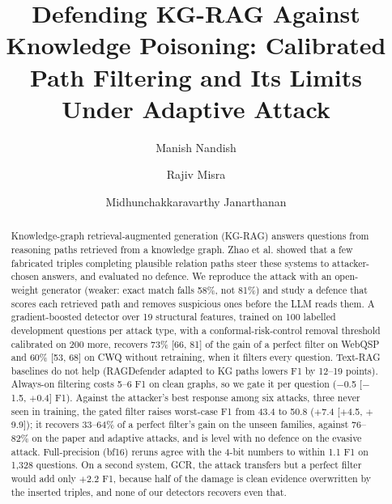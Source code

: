 \documentclass[preprint,12pt]{elsarticle}
\begin{document}
\sloppy

\begin{frontmatter}

\title{Defending KG-RAG Against Knowledge Poisoning: Calibrated Path Filtering and Its Limits Under Adaptive Attack}

\author[iitp,lincoln]{Manish Nandish}
\author[iitp]{Rajiv Misra}
\author[lincoln]{Midhunchakkaravarthy Janarthanan}


\begin{abstract}
Knowledge-graph retrieval-augmented generation (KG-RAG) answers questions from reasoning paths retrieved from a knowledge graph. Zhao et al. showed that a few fabricated triples completing plausible relation paths steer these systems to attacker-chosen answers, and evaluated no defence. We reproduce the attack with an open-weight generator (weaker: exact match falls 58\%, not 81\%) and study a defence that scores each retrieved path and removes suspicious ones before the LLM reads them. A gradient-boosted detector over 19 structural features, trained on 100 labelled development questions per attack type, with a conformal-risk-control removal threshold calibrated on 200 more, recovers 73\% [66, 81] of the gain of a perfect filter on WebQSP and 60\% [53, 68] on CWQ without retraining, when it filters every question. Text-RAG baselines do not help (RAGDefender adapted to KG paths lowers F1 by 12--19 points). Always-on filtering costs 5--6 F1 on clean graphs, so we gate it per question ($-$0.5 [$-$1.5, $+$0.4] F1). Against the attacker's best response among six attacks, three never seen in training, the gated filter raises worst-case F1 from 43.4 to 50.8 ($+$7.4 [$+$4.5, $+$9.9]); it recovers 33--64\% of a perfect filter's gain on the unseen families, against 76--82\% on the paper and adaptive attacks, and is level with no defence on the evasive attack. Full-precision (bf16) reruns agree with the 4-bit numbers to within 1.1 F1 on 1,328 questions. On a second system, GCR, the attack transfers but a perfect filter would add only $+$2.2 F1, because half of the damage is clean evidence overwritten by the inserted triples, and none of our detectors recovers even that.
\end{abstract}


\end{frontmatter}
\end{document}
